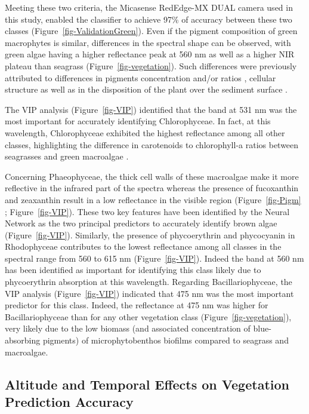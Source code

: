 \documentclass[
  number]{elsarticle}
\begin{document}
Meeting these two criteria, the Micasense RedEdge-MX DUAL camera used in
this study, enabled the classifier to achieve 97\% of accuracy between
these two classes (Figure~\ref{fig-ValidationGreen}). Even if the
pigment composition of green macrophytes is similar, differences in the
spectral shape can be observed, with green algae having a higher
reflectance peak at 560 nm as well as a higher NIR plateau than seagrass
(Figure~\ref{fig-vegetation}). Such differences were previously
attributed to differences in pigments concentration and/or ratios
\citep{bargain2013seasonal}, cellular structure as well as in the
disposition of the plant over the sediment surface \citetext{\citealp[
]{beach1997vivo}; \citealp[
]{kirk1994light}; \citealp{hedley2018influence}}.

The VIP analysis (Figure~\ref{fig-VIP}) identified that the band at 531
nm was the most important for accurately identifying Chlorophyceae. In
fact, at this wavelength, Chlorophyceae exhibited the highest
reflectance among all other classes, highlighting the difference in
carotenoids to chlorophyll-a ratios between seagrasses and green
macroalgae \citep{repolho2017seagrass}.

Concerning Phaeophyceae, the thick cell walls of these macroalgae
\citep{charrier2021growth} make it more reflective in the infrared part
of the spectra \citep{Slaton2001} whereas the presence of fucoxanthin
and zeaxanthin result in a low reflectance in the visible region
(Figure~\ref{fig-Pigm} ; Figure~\ref{fig-VIP}). These two key features
have been identified by the Neural Network as the two principal
predictors to accurately identify brown algae (Figure~\ref{fig-VIP}).
Similarly, the presence of phycoerythrin and phycocyanin in Rhodophyceae
contributes to the lowest reflectance among all classes in the spectral
range from 560 to 615 nm (Figure~\ref{fig-VIP}). Indeed the band at 560
nm has been identified as important for identifying this class likely
due to phycoerythrin absorption at this wavelength. Regarding
Bacillariophyceae, the VIP analysis (Figure~\ref{fig-VIP}) indicated
that 475 nm was the most important predictor for this class. Indeed, the
reflectance at 475 nm was higher for Bacillariophyceae than for any
other vegetation class (Figure~\ref{fig-vegetation}), very likely due to
the low biomass (and associated concentration of blue-absorbing
pigments) of microphytobenthos biofilms compared to seagrass and
macroalgae.

\subsection{Altitude and Temporal Effects on Vegetation Prediction
Accuracy}\label{altitude-and-temporal-effects-on-vegetation-prediction-accuracy}
\end{document}
